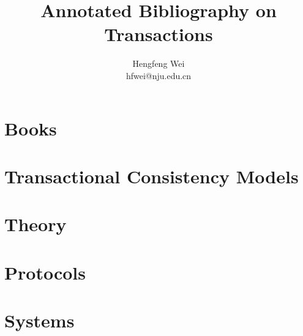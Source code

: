 \documentclass[12pt, letterpaper]{article}
\author{Hengfeng Wei \\ hfwei@nju.edu.cn}
\title{Annotated Bibliography on Transactions}
\begin{document}
\maketitle
\thispagestyle{fancy}
\section{Books} \label{section:books}

\section{Transactional Consistency Models} \label{section:tcm}

\section{Theory} \label{section:theory}

\section{Protocols} \label{section:protocols}

\section{Systems} \label{section:systems}

 
\end{document}
